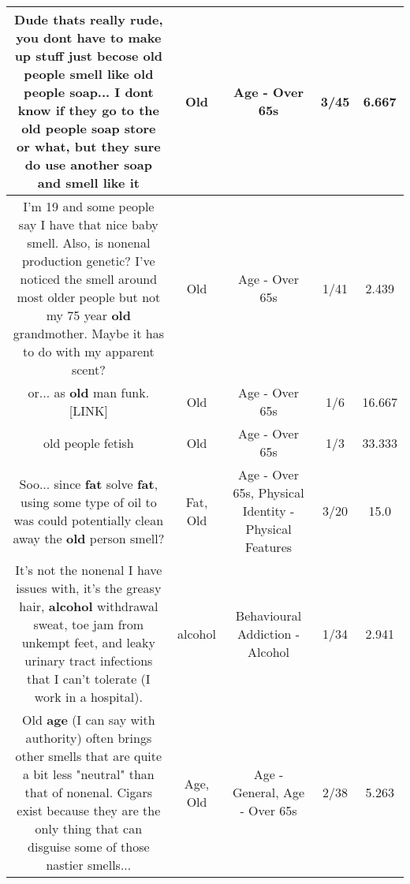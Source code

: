 \documentclass[11pt]{article}
\newlength\mylength
\begin{document}
\begin{center}
\begin{longtable}{|C{.65\mylength}|C{.30\mylength}|C{.12\mylength}|C{.12\mylength}|C{.12\mylength}|}
  \small Dude thats really rude, you dont have to make up stuff just becose \textbf{old} people smell like \textbf{old} people soap... I dont know if they go to the \textbf{old} people soap store or what, but they sure do use another soap and smell like it\normalsize   & Old & Age - Over 65s & 3/45 & 6.667 \\  \hline
  \small I'm 19 and some people say I have that nice baby smell. Also, is nonenal production genetic? I've noticed the smell around most older people but not my 75 year \textbf{old} grandmother. Maybe it has to do with my apparent scent?\normalsize   & Old & Age - Over 65s & 1/41 & 2.439 \\  \hline
  \small or... as \textbf{old} man funk.   [LINK] \normalsize   & Old & Age - Over 65s & 1/6 & 16.667 \\  \hline
  \small old people fetish\normalsize   & Old & Age - Over 65s & 1/3 & 33.333 \\  \hline
  \small Soo... since \textbf{fat} solve \textbf{fat}, using some type of oil to was could potentially clean away the \textbf{old} person smell?\normalsize   & Fat, Old & Age - Over 65s, Physical Identity - Physical Features & 3/20 & 15.0 \\  \hline
  \small It's not the nonenal I have issues with, it's the greasy hair, \textbf{alcohol} withdrawal sweat, toe jam from unkempt feet, and leaky urinary tract infections that I can't tolerate (I work in a hospital).\normalsize   & alcohol & Behavioural Addiction - Alcohol & 1/34 & 2.941 \\  \hline
  \small Old \textbf{age} (I can say with authority) often brings other smells that are quite a bit less "neutral" than that of nonenal.  Cigars exist because they are the only thing that can disguise some of those nastier smells...\normalsize   & Age, Old & Age - General, Age - Over 65s & 2/38 & 5.263 \\  \hline

\end{longtable}
\end{center}
\end{document}
